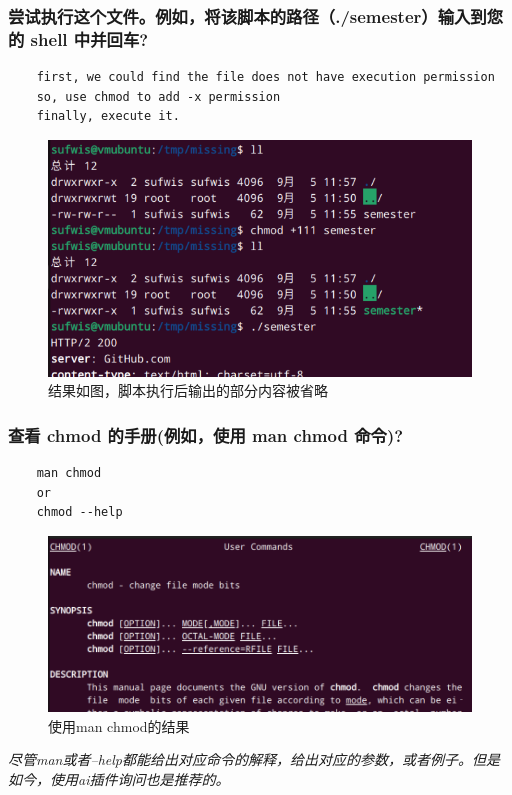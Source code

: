 \documentclass[UTF8]{ctexart}
\begin{document}
\subsubsection{尝试执行这个文件。例如，将该脚本的路径（./semester）输入到您的 shell 中并回车?}
\begin{lstlisting}
	first, we could find the file does not have execution permission
	so, use chmod to add -x permission
	finally, execute it.
\end{lstlisting}
\begin{figure}[H]
	\centering
	\includegraphics[width=0.7\linewidth]{figures/bash_se.png}
	\caption{结果如图，脚本执行后输出的部分内容被省略}
\end{figure}



\subsubsection{查看 chmod 的手册(例如，使用 man chmod 命令)?}
\begin{lstlisting}
	man chmod
	or
	chmod --help
\end{lstlisting}
\begin{figure}[htbp]
	\centering
	\includegraphics[width=0.7\linewidth]{figures/man_chmod.png}
	\caption{使用man chmod的结果}
\end{figure}
\textit{尽管man或者--help都能给出对应命令的解释，给出对应的参数，或者例子。但是如今，使用ai插件询问也是推荐的。}
\\
\end{document}
